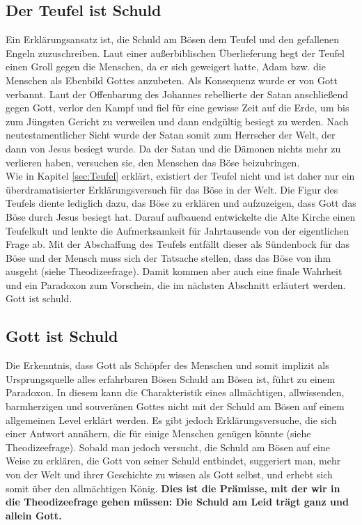 \subsection{Der Teufel ist Schuld}
Ein Erklärungsansatz ist, die Schuld am Bösen dem Teufel und den gefallenen Engeln zuzuschreiben. Laut einer außerbiblischen Überlieferung hegt der Teufel einen Groll gegen die Menschen, da er sich geweigert hatte, Adam bzw. die Menschen als Ebenbild Gottes anzubeten. Als Konsequenz wurde er von Gott verbannt. Laut der Offenbarung des Johannes rebellierte der Satan anschließend gegen Gott, verlor den Kampf und fiel für eine gewisse Zeit auf die Erde, um bis zum Jüngsten Gericht zu verweilen und dann endgültig besiegt zu werden. Nach neutestamentlicher Sicht wurde der Satan somit zum Herrscher der Welt, der dann von Jesus besiegt wurde. Da der Satan und die Dämonen nichts mehr zu verlieren haben, versuchen sie, den Menschen das Böse beizubringen. \\

Wie in Kapitel  \ref{sec:Teufel} erklärt, existiert der Teufel nicht und ist daher nur ein überdramatisierter Erklärungsversuch für das Böse in der Welt. Die Figur des Teufels diente lediglich dazu, das Böse zu erklären und aufzuzeigen, dass Gott das Böse durch Jesus besiegt hat. Darauf aufbauend entwickelte die Alte Kirche einen Teufelkult und lenkte die Aufmerksamkeit für Jahrtausende von der eigentlichen Frage ab. Mit der Abschaffung des Teufels entfällt dieser als Sündenbock für das Böse und der Mensch muss sich der Tatsache stellen, dass das Böse von ihm ausgeht (siehe Theodizeefrage). Damit kommen aber auch eine finale Wahrheit und ein Paradoxon zum Vorschein, die im nächsten Abschnitt erläutert werden. Gott ist schuld.

\subsection{Gott ist Schuld}
Die Erkenntnis, dass Gott als Schöpfer des Menschen und somit implizit als Ursprungsquelle alles erfahrbaren Bösen Schuld am Bösen ist, führt zu einem Paradoxon. In diesem kann die Charakteristik eines allmächtigen, allwissenden, barmherzigen und souveränen Gottes nicht mit der Schuld am Bösen auf einem allgemeinen Level erklärt werden. Es gibt jedoch Erklärungsversuche, die sich einer Antwort annähern, die für einige Menschen genügen könnte (siehe Theodizeefrage). Sobald man jedoch versucht, die Schuld am Bösen auf eine Weise zu erklären, die Gott von seiner Schuld entbindet, suggeriert man, mehr von der Welt und ihrer Geschichte zu wissen als Gott selbst, und erhebt sich somit über den allmächtigen König. \textbf{Dies ist die Prämisse, mit der wir in die Theodizeefrage gehen müssen: Die Schuld am Leid trägt ganz und allein Gott.}

